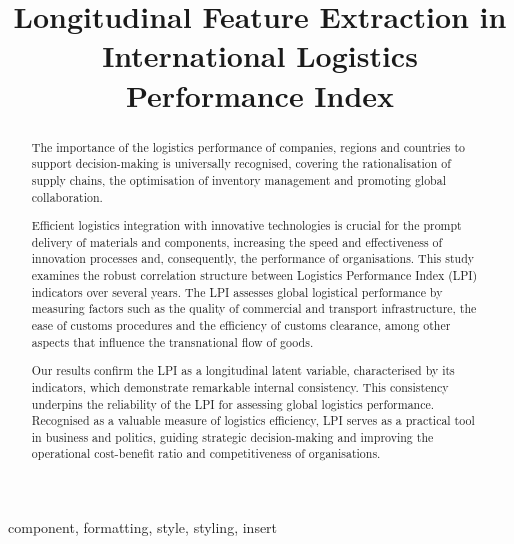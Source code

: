 \documentclass[conference]{IEEEtran}
\begin{document}
\title{Longitudinal Feature Extraction in International Logistics Performance Index
}

\author{
\and
{}
}

\maketitle

\begin{abstract}
 The importance of the logistics performance of companies, regions and countries to support decision-making is universally recognised, covering the rationalisation of supply chains, the optimisation of inventory management and promoting global collaboration. 
      
  Efficient logistics integration with innovative technologies is crucial for the prompt delivery of materials and components, increasing the speed and effectiveness of innovation processes and, consequently, the performance of organisations. This study examines the robust correlation structure between Logistics Performance Index (LPI) indicators over several years. 
  The LPI assesses global logistical performance by measuring factors such as the quality of commercial and transport infrastructure, the ease of customs procedures and the efficiency of customs clearance, among other aspects that influence the transnational flow of goods.

Our results confirm the LPI as a longitudinal latent variable, characterised by its indicators, which demonstrate remarkable internal consistency. This consistency underpins the reliability of the LPI for assessing global logistics performance.
%
Recognised as a valuable measure of logistics efficiency, LPI serves as a practical tool in business and politics, guiding strategic decision-making and improving the operational cost-benefit ratio and competitiveness of organisations.
\end{abstract}

\begin{IEEEkeywords}
component, formatting, style, styling, insert
\end{IEEEkeywords}
\end{document}

